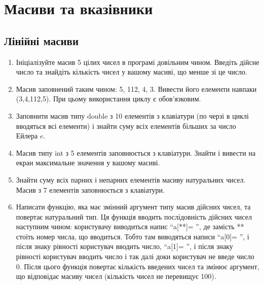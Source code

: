 \documentclass[]{article}
\begin{document}
\section{Масиви та вказівники}

\subsection{Лінійні масиви}

\begin{enumerate}
\item
Ініціалізуйте масив 5 цілих чисел в програмі довільним чином. Введіть
дійсне число та знайдіть кількість чисел у вашому масиві, що менше зі це
число.
\item
Масив заповнений таким чином: 5, 112, 4, 3. Вивести його елементи
навпаки (3,4,112,5). При цьому використання циклу є обов'язковим.
\item
Заповнити масив типу double з 10 елементів з клавіатури (по черзі в
циклі вводяться всі елементи) і знайти суму всіх елементів більших за
число Ейлера \(e\).
\item
Масив типу int з 5 елементів заповнюється з клавіатури. Знайти і вивести
на екран максимальне значення у вашому масиві.
\item
Знайти суму всіх парних і непарних елементів масиву натуральних чисел.
Масив з 7 елементів заповнюється з клавіатури.
\item
Написати функцію, яка має змінний аргумент типу масив дійсних чисел,
та повертає натуральний тип. Ця функція вводить послідовність дійсних чисел наступним
чином: користувачу виводиться напис ``a{[}**{]}= '', де замість **
стоїть номер числа, що вводиться. Тобто там виводяться написи
``a{[}0{]}= '', і після знаку рівності користувач вводить число,
``a{[}1{]}= '', і після знаку рівності користувач вводить число і так
далі доки користувач не введе число 0. Після цього функція повертає
кількість введених чисел та змінює аргумент, що відповідає масиву чисел
(кількість чисел не перевищує 100).


\end{enumerate}
\end{document}
